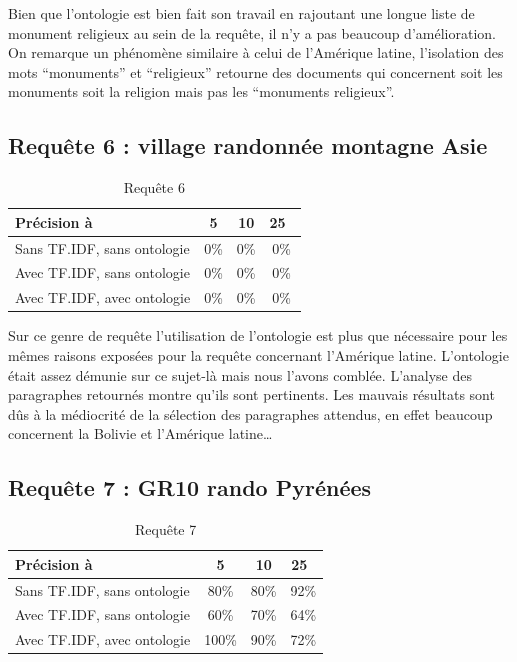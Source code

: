 \documentclass{article}
\begin{document}
Bien que l’ontologie est bien fait son travail en rajoutant une longue liste de
monument religieux au sein de la requête, il n’y a pas beaucoup d’amélioration. On
remarque un phénomène similaire à celui de l’Amérique latine, l’isolation des mots
“monuments” et “religieux” retourne des documents qui concernent soit les monuments
soit la religion mais pas les “monuments religieux”.

\subsection{Requête 6 : \og village randonnée montagne Asie \fg }

\begin{table}[H]
    \centering
    \caption{Requête 6}
\begin{tabular}{|l|c|c|c|}
    \hline
    Précision à & 5 & 10 & 25 \\
    \hline
    Sans TF.IDF, sans ontologie & 0\% & 0\% & 0\% \\
    \hline
    Avec TF.IDF, sans ontologie & 0\% & 0\% & 0\% \\
    \hline
    Avec TF.IDF, avec ontologie & 0\% & 0\% & 0\% \\
    \hline
\end{tabular}
\end{table}

Sur ce genre de requête l’utilisation de l’ontologie est plus que nécessaire pour les
mêmes raisons exposées pour la requête concernant l’Amérique latine. L’ontologie était
assez démunie sur ce sujet-là mais nous l’avons comblée. L’analyse des paragraphes
retournés montre qu'ils sont pertinents. Les mauvais résultats sont dûs à la
médiocrité de la sélection des paragraphes attendus, en effet beaucoup concernent la
Bolivie et l’Amérique latine…

\subsection{Requête 7 : \og GR10 rando Pyrénées \fg }

\begin{table}[H]
    \centering
    \caption{Requête 7}
\begin{tabular}{|l|c|c|c|}
    \hline
    Précision à & 5 & 10 & 25 \\
    \hline
    Sans TF.IDF, sans ontologie & 80\% & 80\% & 92\% \\
    \hline
    Avec TF.IDF, sans ontologie & 60\% & 70\% & 64\% \\
    \hline
    Avec TF.IDF, avec ontologie & 100\% & 90\% & 72\% \\
    \hline
\end{tabular}
\end{table}
\end{document}
